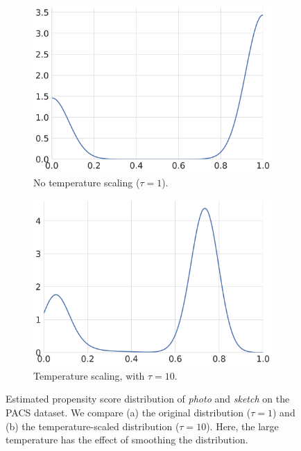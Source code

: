 \begin{figure}[ht!]
     \centering
     \begin{subfigure}[b]{0.49\textwidth}
         \centering
         \includegraphics[scale=0.2]{figures/ps_photo_sketch_temp1.png}
         \caption{No temperature scaling ($\tau = 1$).}
     \end{subfigure}
     \hfill
     \begin{subfigure}[b]{0.49\textwidth}
         \centering
         \includegraphics[scale=0.2]{figures/ps_photo_sketch_temp10.png}
         \caption{Temperature scaling, with $\tau=10$.}
     \end{subfigure}
    \caption{Estimated propensity score distribution of \textit{photo} and \textit{sketch} on the
    PACS dataset. We compare (a) the original distribution ($\tau=1$) and (b) the
temperature-scaled distribution ($\tau=10$). Here, the large temperature has the effect of smoothing the distribution.}
    \label{fig:pacs_ps_ps}
\end{figure}



